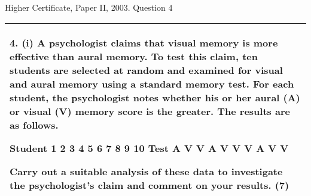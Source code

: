 \documentclass[a4paper,12pt]{article}
\begin{document}
Higher Certificate, Paper II, 2003. Question 4

\begin{table}[ht!]
 
\centering
 
\begin{tabular}{|p{15cm}|}
 
\hline  

4. (i) A psychologist claims that visual memory is more effective than aural memory.  To test this claim, ten students are selected at random and examined for visual and aural memory using a standard memory test.  For each student, the psychologist notes whether his or her aural (A) or visual (V) memory score is the greater.  The results are as follows. 
 
Student 1 2 3 4 5 6 7 8 9 10 
Test A V V A V V V A V V 
 
Carry out a suitable analysis of these data to investigate the psychologist’s claim and comment on your results. (7) 

\\ \hline
  
\end{tabular}

\end{table}

\begin{table}[ht!]
 
\centering
 
\begin{tabular}{|p{15cm}|}
 
\hline  

\\ \hline
  
\end{tabular}

\end{table}
\end{document}
